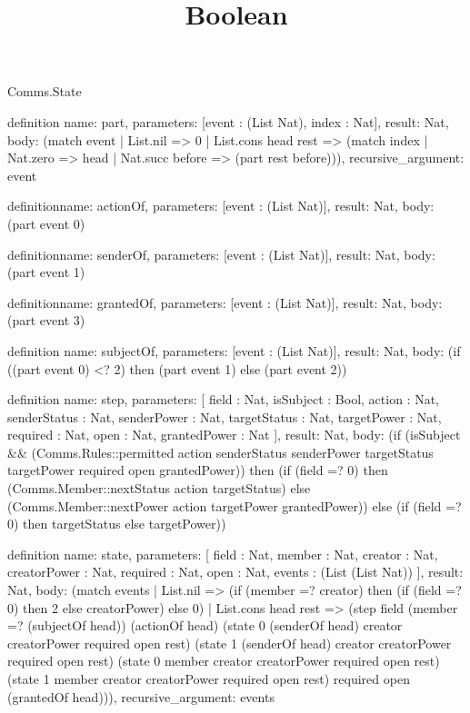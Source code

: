 \begin{lexlean}{Comms.State}
\title{Boolean}
\begin{semanticmodule}
definition{
  name: part,
  parameters: [event : (List Nat), index : Nat],
  result: Nat,
  body: (match event
    | List.nil => 0
    | List.cons head rest => (match index
      | Nat.zero => head
      | Nat.succ before => (part rest before))),
  recursive_argument: event
}

definition{name: actionOf, parameters: [event : (List Nat)], result: Nat, body: (part event 0)}

definition{name: senderOf, parameters: [event : (List Nat)], result: Nat, body: (part event 1)}

definition{name: grantedOf, parameters: [event : (List Nat)], result: Nat, body: (part event 3)}

definition{
  name: subjectOf,
  parameters: [event : (List Nat)],
  result: Nat,
  body: (if ((part event 0) <? 2) then (part event 1) else (part event 2))
}

definition{
  name: step,
  parameters: [
    field : Nat,
    isSubject : Bool,
    action : Nat,
    senderStatus : Nat,
    senderPower : Nat,
    targetStatus : Nat,
    targetPower : Nat,
    required : Nat,
    open : Nat,
    grantedPower : Nat
  ],
  result: Nat,
  body: (if (isSubject && (Comms.Rules::permitted action senderStatus senderPower targetStatus targetPower required open grantedPower)) then (if (field =? 0) then (Comms.Member::nextStatus action targetStatus) else (Comms.Member::nextPower action targetPower grantedPower)) else (if (field =? 0) then targetStatus else targetPower))
}

definition{
  name: state,
  parameters: [
    field : Nat,
    member : Nat,
    creator : Nat,
    creatorPower : Nat,
    required : Nat,
    open : Nat,
    events : (List (List Nat))
  ],
  result: Nat,
  body: (match events
    | List.nil => (if (member =? creator) then (if (field =? 0) then 2 else creatorPower) else 0)
    | List.cons head rest => (step field (member =? (subjectOf head)) (actionOf head) (state 0 (senderOf head) creator creatorPower required open rest) (state 1 (senderOf head) creator creatorPower required open rest) (state 0 member creator creatorPower required open rest) (state 1 member creator creatorPower required open rest) required open (grantedOf head))),
  recursive_argument: events
}
\end{semanticmodule}
\end{lexlean}
